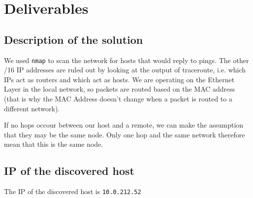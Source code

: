 \documentclass[parskip=full]{scrartcl}
\begin{document}

\section{Deliverables}

\subsection{Description of the solution}
We used \texttt{nmap} to scan the network for hosts that would reply to pings. 
The other /16 IP addresses are ruled out by looking at the output of traceroute, i.e. which IPs act as routers and which act as hosts.
We are operating on the Ethernet Layer in the local network, so packets are routed based on the MAC address (that is why the MAC Address doesn't change when a packet is routed to a different network).

If no hops occour between our host and a remote, we can make the assumption that they may be the same node.
Only one hop and the same network therefore mean that this is the same node.

\subsection{IP of the discovered host}
The IP of the discovered host is \texttt{10.0.212.52}
\end{document}
